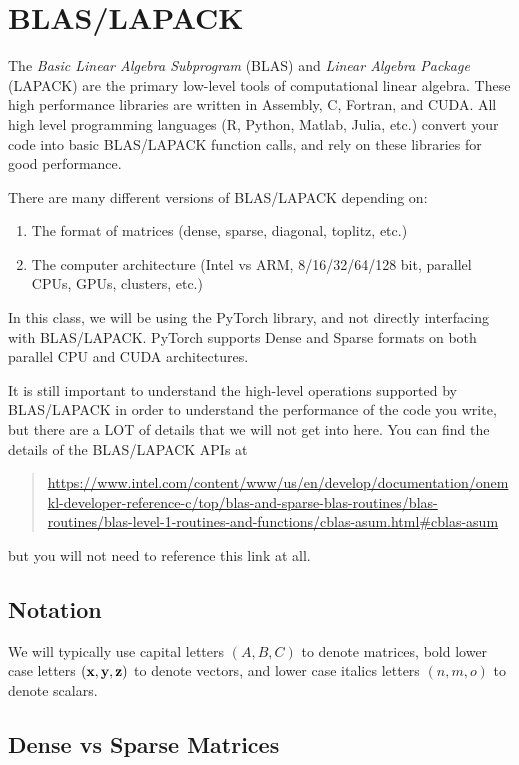 \documentclass[10pt]{article}
\theoremstyle{definition}
\begin{document}

\newpage
\section{BLAS/LAPACK}

The \emph{Basic Linear Algebra Subprogram} (BLAS) and \emph{Linear Algebra Package} (LAPACK) are the primary low-level tools of computational linear algebra.
These high performance libraries are written in Assembly, C, Fortran, and CUDA.
All high level programming languages (R, Python, Matlab, Julia, etc.) convert your code into basic BLAS/LAPACK function calls,
and rely on these libraries for good performance.

There are many different versions of BLAS/LAPACK depending on:
\begin{enumerate}
    \item The format of matrices (dense, sparse, diagonal, toplitz, etc.)
    \item The computer architecture (Intel vs ARM, 8/16/32/64/128 bit, parallel CPUs, GPUs, clusters, etc.)
\end{enumerate}
In this class, we will be using the PyTorch library,
and not directly interfacing with BLAS/LAPACK.
PyTorch supports Dense and Sparse formats on both parallel CPU and CUDA architectures.

It is still important to understand the high-level operations supported by BLAS/LAPACK in order to understand the performance of the code you write,
but there are a LOT of details that we will not get into here.
You can find the details of the BLAS/LAPACK APIs at
\begin{quote}
    \url{https://www.intel.com/content/www/us/en/develop/documentation/onemkl-developer-reference-c/top/blas-and-sparse-blas-routines/blas-routines/blas-level-1-routines-and-functions/cblas-asum.html#cblas-asum}
\end{quote}
but you will not need to reference this link at all.

\subsection{Notation}

We will typically use capital letters $(A, B, C)$ to denote matrices,
bold lower case letters $(\textbf x, \textbf y, \textbf z)$ to denote vectors,
and lower case italics letters $(n, m, o)$ to denote scalars.

\subsection{Dense vs Sparse Matrices}
\end{document}
